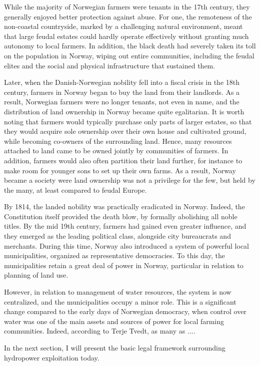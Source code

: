 While the majority of Norwegian farmers were tenants in the 17th century, they generally enjoyed better protection against abuse. For one, the remoteness of the non-coastal countryside, marked by a challenging natural environment, meant that large feudal estates could hardly operate effectively without granting much autonomy to local farmers. In addition, the black death had severely taken its toll on the population in Norway, wiping out entire communities, including the feudal elites and the social and physical infrastructure that sustained them.

Later, when the Danish-Norwegian nobility fell into a fiscal crisis in the 18th century, farmers in Norway began to buy the land from their landlords. As a result, Norwegian farmers were no longer tenants, not  even in name, and the distribution of land ownership in Norway became quite egalitarian. It is worth noting that farmers would typically purchase only parts of larger estates, so that they would acquire sole ownership over their own house and cultivated ground, while becoming co-owners of the surrounding land. Hence, many resources attached to land came to be owned jointly by communities of farmers. In addition, farmers would also often partition their land further, for instance to make room for younger sons to set up their own farms. As a result, Norway became a society were land ownership was not a privilege for the few, but held by the many, at least compared to feudal Europe.

By 1814, the landed nobility was practically eradicated in Norway. Indeed, the Constitution itself provided the death blow, by formally abolishing all noble titles. By the mid 19th century, farmers had gained even greater influence, and they emerged as the leading political class, alongside city bureaucrats and merchants. During this time, Norway also introduced a system of powerful local municipalities, organized as representative democracies. To this day, the municipalities retain a great deal of power in Norway, particular in relation to planning of land use. 

However, in relation to management of water resources, the system is now centralized, and the municipalities occupy a minor role. This is a significant change compared to the early days of Norwegian democracy, when control over water was one of the main assets and sources of power for local farming communities. Indeed, according to Terje Tvedt, as many as ....

In the next section, I will present the basic legal framework surrounding hydropower exploitation today.

